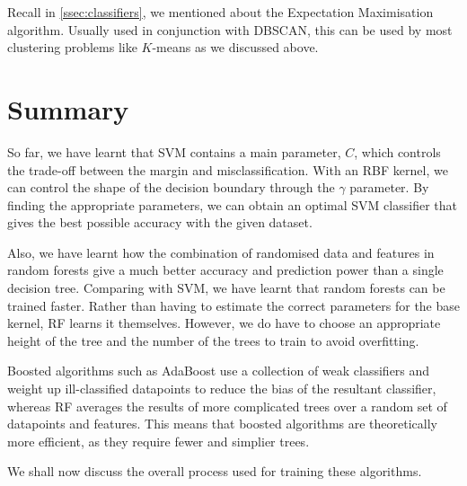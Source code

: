 Recall in \autoref{ssec:classifiers}, we mentioned about the Expectation Maximisation algorithm. Usually used in conjunction with DBSCAN, this can be used by most clustering problems like $K$-means as we discussed above.

\newpage
\section{Summary}
So far, we have learnt that SVM contains a main parameter, $C$, which controls the trade-off between the margin and misclassification. With an RBF kernel, we can control the shape of the decision boundary through the $\gamma$ parameter. By finding the appropriate parameters, we can obtain an optimal SVM classifier that gives the best possible accuracy with the given dataset.

Also, we have learnt how the combination of randomised data and features in random forests give a much better accuracy and prediction power than a single decision tree. Comparing with SVM, we have learnt that random forests can be trained faster. Rather than having to estimate the correct parameters for the base kernel, RF learns it themselves. However, we do have to choose an appropriate height of the tree and the number of the trees to train to avoid overfitting.

Boosted algorithms such as AdaBoost use a collection of weak classifiers and weight up ill-classified datapoints to reduce the bias of the resultant classifier, whereas RF averages the results of more complicated trees over a random set of datapoints and features. This means that boosted algorithms are theoretically more efficient, as they require fewer and simplier trees.

We shall now discuss the overall process used for training these algorithms.
